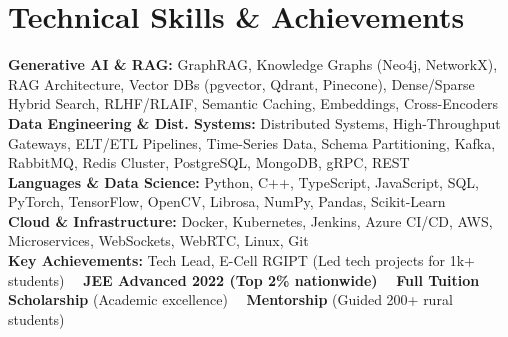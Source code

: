 \documentclass[10pt,letterpaper]{article}
\begin{document}
\section{Technical Skills \& Achievements}
\vspace{2pt}
\small{
\textbf{Generative AI \& RAG:} GraphRAG, Knowledge Graphs (Neo4j, NetworkX), RAG Architecture, Vector DBs (pgvector, Qdrant, Pinecone), Dense/Sparse Hybrid Search, RLHF/RLAIF, Semantic Caching, Embeddings, Cross-Encoders \\[2.2pt]
\textbf{Data Engineering \& Dist. Systems:} Distributed Systems, High-Throughput Gateways, ELT/ETL Pipelines, Time-Series Data, Schema Partitioning, Kafka, RabbitMQ, Redis Cluster, PostgreSQL, MongoDB, gRPC, REST \\[2.2pt]
\textbf{Languages \& Data Science:} Python, C++, TypeScript, JavaScript, SQL, PyTorch, TensorFlow, OpenCV, Librosa, NumPy, Pandas, Scikit-Learn \\[2.2pt]
\textbf{Cloud \& Infrastructure:} Docker, Kubernetes, Jenkins, Azure CI/CD, AWS, Microservices, WebSockets, WebRTC, Linux, Git \\[2.2pt]
\textbf{Key Achievements:} Tech Lead, E-Cell RGIPT (Led tech projects for 1k+ students) \ \textbar\ \textbf{JEE Advanced 2022 (Top 2\% nationwide)} \ \textbar\ \textbf{Full Tuition Scholarship} (Academic excellence) \ \textbar\ \textbf{Mentorship} (Guided 200+ rural students)
}
\end{document}
